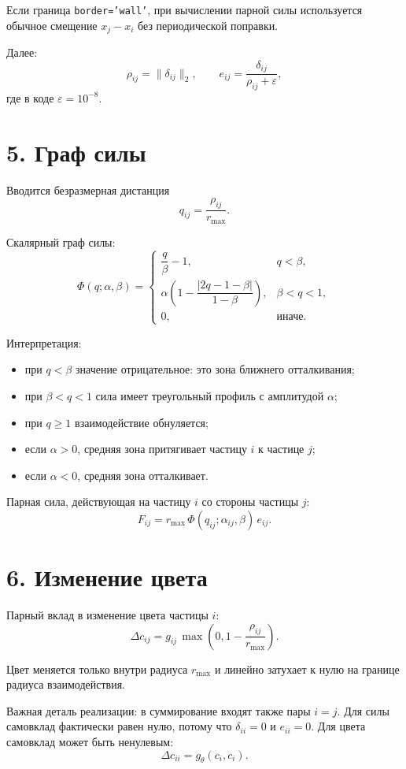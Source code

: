 \documentclass[11pt,a4paper]{article}
\begin{document}
Если граница \texttt{border='wall'}, при вычислении парной силы используется
обычное смещение $x_j-x_i$ без периодической поправки.

Далее:
\[
\rho_{ij}=\|\delta_{ij}\|_2,\qquad
e_{ij}=\frac{\delta_{ij}}{\rho_{ij}+\varepsilon},
\]
где в коде $\varepsilon=10^{-8}$.

\section*{5. Граф силы}

Вводится безразмерная дистанция
\[
q_{ij}=\frac{\rho_{ij}}{r_{\max}}.
\]

Скалярный граф силы:
\[
\Phi(q;\alpha,\beta)=
\begin{cases}
\dfrac{q}{\beta}-1, & q<\beta,\\[8pt]
\alpha\left(1-\dfrac{|2q-1-\beta|}{1-\beta}\right), & \beta<q<1,\\[8pt]
0, & \text{иначе}.
\end{cases}
\]

Интерпретация:
\begin{itemize}
  \item при $q<\beta$ значение отрицательное: это зона ближнего отталкивания;
  \item при $\beta<q<1$ сила имеет треугольный профиль с амплитудой $\alpha$;
  \item при $q\ge 1$ взаимодействие обнуляется;
  \item если $\alpha>0$, средняя зона притягивает частицу $i$ к частице $j$;
  \item если $\alpha<0$, средняя зона отталкивает.
\end{itemize}

Парная сила, действующая на частицу $i$ со стороны частицы $j$:
\[
F_{ij}=r_{\max}\,\Phi(q_{ij};\alpha_{ij},\beta)\,e_{ij}.
\]

\section*{6. Изменение цвета}

Парный вклад в изменение цвета частицы $i$:
\[
\Delta c_{ij}=g_{ij}\,\max\left(0,1-\frac{\rho_{ij}}{r_{\max}}\right).
\]

Цвет меняется только внутри радиуса $r_{\max}$ и линейно затухает к нулю на
границе радиуса взаимодействия.

Важная деталь реализации: в суммирование входят также пары $i=j$. Для силы
самовклад фактически равен нулю, потому что $\delta_{ii}=0$ и $e_{ii}=0$.
Для цвета самовклад может быть ненулевым:
\[
\Delta c_{ii}=g_\theta(c_i,c_i).
\]
\end{document}
